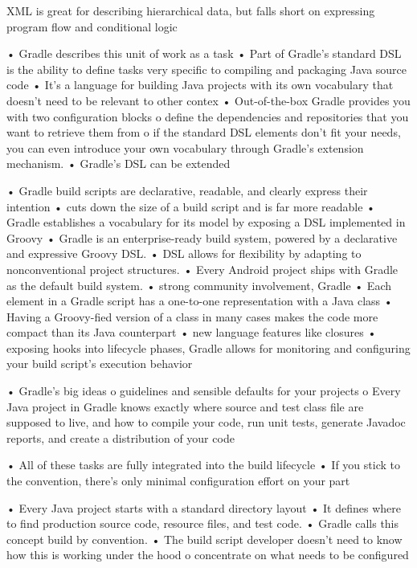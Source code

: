 XML is great for describing hierarchical data, but falls short on expressing program flow and conditional logic

•	Gradle describes this unit of work as a task
•	Part of Gradle’s standard DSL is the ability to define tasks very specific to compiling and packaging Java source code
•	It’s a language for building Java projects with its own vocabulary that doesn’t need to be relevant to other contex
•	Out-of-the-box Gradle provides you with two configuration blocks
o	define the dependencies and repositories that you want to retrieve them from
o	if the standard DSL elements don’t fit your needs, you can even introduce your own vocabulary through Gradle’s extension mechanism.
•	Gradle’s DSL can be extended

•	Gradle build scripts are declarative, readable, and clearly express their intention
•	cuts down the size of a build script and is far more readable
•	Gradle establishes a vocabulary for its model by exposing a DSL implemented in Groovy
•	Gradle is an enterprise-ready build system, powered by a declarative and expressive Groovy DSL.
•	DSL allows for flexibility by adapting to nonconventional project structures.
•	Every Android project ships with Gradle as the default build system.
•	strong community involvement, Gradle
•	Each element in a Gradle script has a one-to-one representation with a Java class
•	Having a Groovy-fied version of a class in many cases makes the code more compact than its Java counterpart
•	new language features like closures
•	exposing hooks into lifecycle phases, Gradle allows for monitoring and configuring your build script’s execution behavior

•	Gradle’s big ideas 
o	guidelines and sensible defaults for your projects
o	Every Java project in Gradle knows exactly where source and test class file are supposed to live, and how to compile your code, run unit tests, generate Javadoc reports, and create a distribution of your code

•	All of these tasks are fully integrated into the build lifecycle
•	If you stick to the convention, there’s only minimal configuration effort on your part


•	Every Java project starts with a standard directory layout
•	It defines where to find production source code, resource files, and test code.
•	Gradle calls this concept build by convention.
•	The build script developer doesn’t need to know how this is working under the hood
	o	concentrate on what needs to be configured
	
